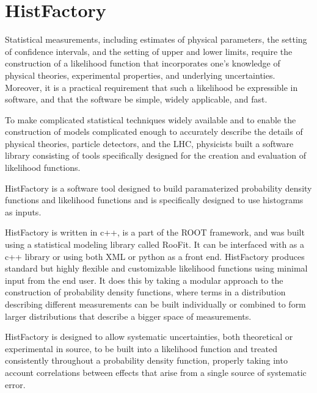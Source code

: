 

\chapter{HistFactory}
\label{app:histfactory}

Statistical measurements, including estimates of physical parameters, the setting of confidence intervals, and the setting of upper and lower limits, require the construction of a likelihood function that incorporates one's knowledge of physical theories, experimental properties, and underlying uncertainties.
Moreover, it is a practical requirement that such a likelihood be expressible in software, and that the software be simple, widely applicable, and fast.

To make complicated statistical techniques widely available and to enable the construction of models complicated enough to accurately describe the details of physical theories, particle detectors, and the LHC, physicists built a software library consisting of tools specifically designed for the creation and evaluation of likelihood functions.

HistFactory is a software tool designed to build paramaterized probability density functions and likelihood functions and is specifically designed to use histograms as inputs.

HistFactory is written in c++, is a part of the ROOT framework, and was built using a statistical modeling library called RooFit.
It can be interfaced with as a c++ library or using both XML or python as a front end.
HistFactory produces standard but highly flexible and customizable likelihood functions using minimal input from the end user.
It does this by taking a modular approach to the construction of probability density functions, where terms in a distribution describing different measurements can be built individually or combined to form larger distributions that describe a bigger space of measurements.

HistFactory is designed to allow systematic uncertainties, both theoretical or experimental in source, to be built into a likelihood function and treated consistently throughout a probability density function, properly taking into account correlations between effects that arise from a single source of systematic error.



